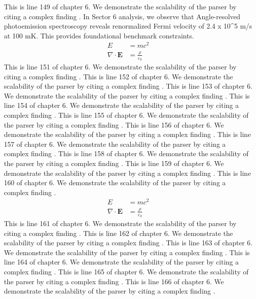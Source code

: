 This is line 149 of chapter 6. We demonstrate the scalability of the parser by citing a complex finding \cite{ref6_149}.
In Sector 6 analysis, we observe that Angle-resolved photoemission spectroscopy reveals renormalized Fermi velocity of 2.4 x 10^5 m/s at 100 mK. This provides foundational benchmark constraints.
\begin{align*}
  E &= mc^2 \\
  \nabla \cdot \mathbf{E} &= \frac{\rho}{\varepsilon_0}
\end{align*}
This is line 151 of chapter 6. We demonstrate the scalability of the parser by citing a complex finding \cite{ref6_151}.
This is line 152 of chapter 6. We demonstrate the scalability of the parser by citing a complex finding \cite{ref6_152}.
This is line 153 of chapter 6. We demonstrate the scalability of the parser by citing a complex finding \cite{ref6_153}.
This is line 154 of chapter 6. We demonstrate the scalability of the parser by citing a complex finding \cite{ref6_154}.
This is line 155 of chapter 6. We demonstrate the scalability of the parser by citing a complex finding \cite{ref6_155}.
This is line 156 of chapter 6. We demonstrate the scalability of the parser by citing a complex finding \cite{ref6_156}.
This is line 157 of chapter 6. We demonstrate the scalability of the parser by citing a complex finding \cite{ref6_157}.
This is line 158 of chapter 6. We demonstrate the scalability of the parser by citing a complex finding \cite{ref6_158}.
This is line 159 of chapter 6. We demonstrate the scalability of the parser by citing a complex finding \cite{ref6_159}.
This is line 160 of chapter 6. We demonstrate the scalability of the parser by citing a complex finding \cite{ref6_160}.
\begin{align*}
  E &= mc^2 \\
  \nabla \cdot \mathbf{E} &= \frac{\rho}{\varepsilon_0}
\end{align*}
This is line 161 of chapter 6. We demonstrate the scalability of the parser by citing a complex finding \cite{ref6_161}.
This is line 162 of chapter 6. We demonstrate the scalability of the parser by citing a complex finding \cite{ref6_162}.
This is line 163 of chapter 6. We demonstrate the scalability of the parser by citing a complex finding \cite{ref6_163}.
This is line 164 of chapter 6. We demonstrate the scalability of the parser by citing a complex finding \cite{ref6_164}.
This is line 165 of chapter 6. We demonstrate the scalability of the parser by citing a complex finding \cite{ref6_165}.
This is line 166 of chapter 6. We demonstrate the scalability of the parser by citing a complex finding \cite{ref6_166}.
